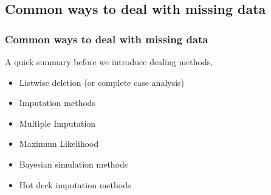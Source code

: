 \documentclass{beamer}
\begin{document}
\subsection{Common ways to deal with missing data}
\fontsize{11pt}{7.2}\selectfont
\begin{frame}
\frametitle{Common ways to deal with missing data}
A quick summary before we introduce dealing methods, \cite{p3}\\
	\begin{itemize}
		\item Listwise deletion (or complete case analysis)
		\item Imputation methods
		\item Multiple Imputation
		\item Maximum Likelihood 
		\item Bayesian simulation methods
		\item Hot deck imputation methods
	\end{itemize}
\end{frame}
\end{document}
